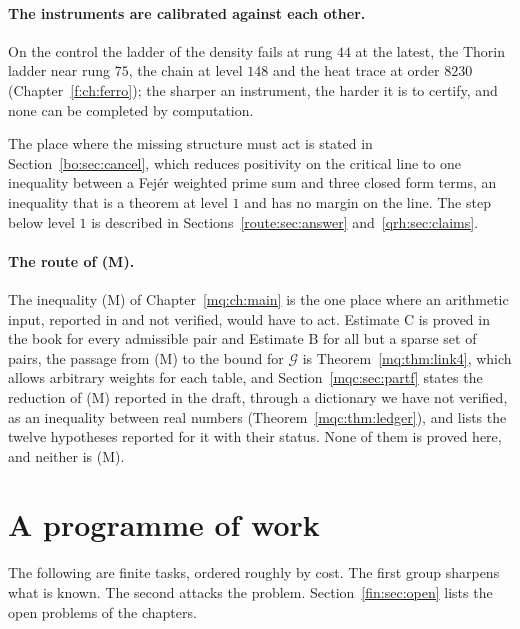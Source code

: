 \paragraph{The instruments are calibrated against each other.} On the control the ladder of the density fails at rung $44$ at the latest, the Thorin ladder near rung $75$, the chain at level $148$ and the heat trace at order $8230$ (Chapter~\ref{f:ch:ferro}); the sharper an instrument, the harder it is to certify, and none can be completed by computation.

The place where the missing structure must act is stated in Section~\ref{bo:sec:cancel}, which reduces positivity on the critical line to one inequality between a Fej\'er weighted prime sum and three closed form terms, an inequality that is a theorem at level $1$ and has no margin on the line. The step below level $1$ is described in Sections~\ref{route:sec:answer} and~\ref{qrh:sec:claims}.

\paragraph{The route of (M).} The inequality (M) of Chapter~\ref{mq:ch:main} is the one place where an arithmetic input, reported in \cite{Rub26} and not verified, would have to act. Estimate C is proved in the book for every admissible pair and Estimate B for all but a sparse set of pairs, the passage from (M) to the bound for $\mathcal G$ is Theorem~\ref{mq:thm:link4}, which allows arbitrary weights for each table, and Section~\ref{mqc:sec:partf} states the reduction of (M) reported in the draft, through a dictionary we have not verified, as an inequality between real numbers (Theorem~\ref{mqc:thm:ledger}), and lists the twelve hypotheses reported for it with their status. None of them is proved here, and neither is (M).

\section{A programme of work}\label{fin:sec:programme}

The following are finite tasks, ordered roughly by cost. The first group sharpens what is known. The second attacks the problem. Section~\ref{fin:sec:open} lists the open problems of the chapters.

